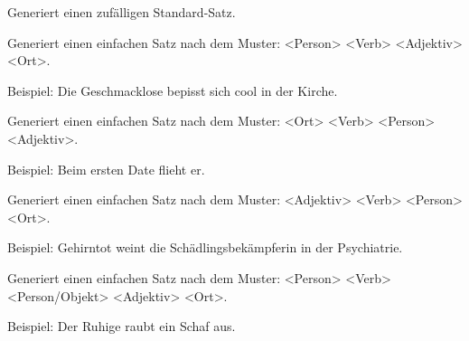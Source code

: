 \documentclass[a4paper,12pt,oneside]{sphinxmanual}
\begin{document}
\begin{fulllineitems}
\label{module:pyzufall.satz.satz_standard}
Generiert einen zufälligen Standard-Satz.

\end{fulllineitems}


\begin{fulllineitems}
\label{module:pyzufall.satz.satz_standard_1}
Generiert einen einfachen Satz nach dem Muster: \textless{}Person\textgreater{} \textless{}Verb\textgreater{} \textless{}Adjektiv\textgreater{} \textless{}Ort\textgreater{}.

Beispiel: Die Geschmacklose bepisst sich cool in der Kirche.

\end{fulllineitems}


\begin{fulllineitems}
\label{module:pyzufall.satz.satz_standard_2}
Generiert einen einfachen Satz nach dem Muster: \textless{}Ort\textgreater{} \textless{}Verb\textgreater{} \textless{}Person\textgreater{} \textless{}Adjektiv\textgreater{}.

Beispiel: Beim ersten Date flieht er.

\end{fulllineitems}


\begin{fulllineitems}
\label{module:pyzufall.satz.satz_standard_3}
Generiert einen einfachen Satz nach dem Muster: \textless{}Adjektiv\textgreater{} \textless{}Verb\textgreater{} \textless{}Person\textgreater{} \textless{}Ort\textgreater{}.

Beispiel: Gehirntot weint die Schädlingsbekämpferin in der Psychiatrie.

\end{fulllineitems}


\begin{fulllineitems}
\label{module:pyzufall.satz.satz_standard_4}
Generiert einen einfachen Satz nach dem Muster: \textless{}Person\textgreater{} \textless{}Verb\textgreater{} \textless{}Person/Objekt\textgreater{} \textless{}Adjektiv\textgreater{} \textless{}Ort\textgreater{}.

Beispiel: Der Ruhige raubt ein Schaf aus.

\end{fulllineitems}
\end{document}
